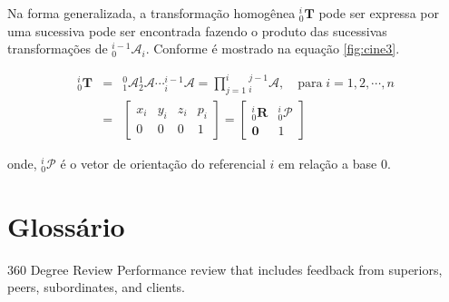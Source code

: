     Na forma generalizada, a transformação homogênea ${}^{i}_0\mathbf{T}$ pode ser expressa por uma sucessiva pode ser encontrada fazendo o produto das sucessivas transformações de ${}^{i-1}_0\mathcal{A}_i$. Conforme é mostrado na equação \eqref{fig:cine3}.
    
    \begin{equation}\label{fig:cine3}
    \begin{array}{lcl}
    {}^i_0\mathbf{T} &= & {}^0_1\mathcal{A}{}^1_2\mathcal{A} \cdots {}^{i-1}_i\mathcal{A} = \prod \limits^i_{j=1}{}^{j-1}_i\mathcal{A}, \quad \mathrm{para\;}i=1,2,\cdots,n\\[.2cm]
    & = &
    \begin{bmatrix}
    x_i & y_i & z_i & p_i\\
    0 & 0 & 0 & 1
    \end{bmatrix} = 
    \begin{bmatrix}
    {}^i_0\mathbf{R} & {}^i_0\mathcal{P}\\
    \mathbf{0} & 1
    \end{bmatrix}
    \end{array}
    \end{equation}
    
    \noindent onde, ${}^i_0\mathcal{P}$ é o vetor de orientação do referencial $i$ em relação a base $0$.

\section{Glossário}
\begin{Glossary}
\item[360 Degree Review] Performance review that includes feedback from superiors, peers, subordinates, and clients.
\end{Glossary}



